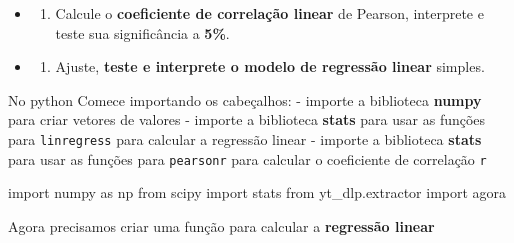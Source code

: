\documentclass[
]{book}
\newenvironment{Shaded}{\begin{snugshade}}{\end{snugshade}}
\newcommand{\ImportTok}[1]{#1}
\newcommand{\NormalTok}[1]{#1}
\providecommand{\tightlist}{%
  \setlength{\itemsep}{0pt}\setlength{\parskip}{0pt}}
\begin{document}
\begin{itemize}
\tightlist
\item
  \begin{enumerate}
  \def\labelenumi{\alph{enumi})}
  \tightlist
  \item
    Calcule o \textbf{coeficiente de correlação linear} de Pearson,
    interprete e teste sua significância a \textbf{5\%}.
  \end{enumerate}
\item
  \begin{enumerate}
  \def\labelenumi{\alph{enumi})}
  \setcounter{enumi}{1}
  \tightlist
  \item
    Ajuste, \textbf{teste e interprete o modelo de regressão linear}
    simples.
  \end{enumerate}
\end{itemize}

No python Comece importando os cabeçalhos: - importe a biblioteca
\textbf{numpy} para criar vetores de valores - importe a biblioteca \textbf{stats}
para usar as funções para \texttt{linregress} para calcular a regressão
linear - importe a biblioteca \textbf{stats} para usar as funções para
\texttt{pearsonr} para calcular o coeficiente de correlação \texttt{r}

\begin{Shaded}
\begin{Highlighting}[]
\ImportTok{import}\NormalTok{ numpy }\ImportTok{as}\NormalTok{ np}
\ImportTok{from}\NormalTok{ scipy }\ImportTok{import}\NormalTok{ stats}
\ImportTok{from}\NormalTok{ yt\_dlp.extractor }\ImportTok{import}\NormalTok{ agora}
\end{Highlighting}
\end{Shaded}

Agora precisamos criar uma função para calcular a \textbf{regressão linear}
\end{document}
